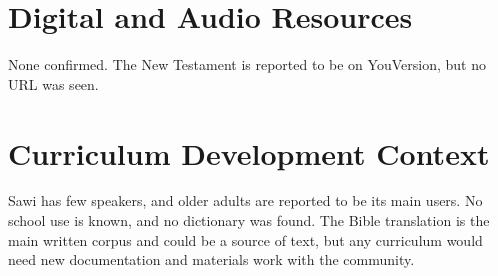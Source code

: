 \documentclass[12pt]{article}
\begin{document}
\section{Digital and Audio Resources}
None confirmed. The New Testament is reported to be on YouVersion, but no URL was seen.

\section{Curriculum Development Context}
Sawi has few speakers, and older adults are reported to be its main users. No school use is known, and no dictionary was found. The Bible translation is the main written corpus and could be a source of text, but any curriculum would need new documentation and materials work with the community.
\end{document}
